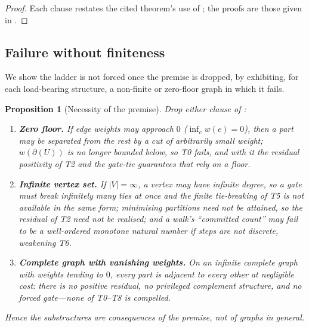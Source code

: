 \documentclass[11pt,a4paper]{article}
\theoremstyle{thmstyle}
\newtheorem{proposition}[theorem]{Proposition}
\theoremstyle{definition}
\theoremstyle{remark}
\newcommand{\V}{V}                        %
\newcommand{\wt}{w}                       %
\newcommand{\cut}{\partial}               %
\newcommand{\abs}[1]{\lvert#1\rvert}
\begin{document}
\begin{proof}
Each clause restates the cited theorem's use of ; the proofs are
those given in .
\end{proof}

\subsection{Failure without finiteness}

We show the ladder is not forced once the premise is dropped, by exhibiting, for
each load-bearing structure, a non-finite or zero-floor graph in which it fails.

\begin{proposition}[Necessity of the premise]
\label{prop:necessity}
Drop either clause of :
\begin{enumerate}[label=\textup{(\alph*)},leftmargin=2.2em]
\item \textbf{Zero floor.} If edge weights may approach $0$
\textup{(}$\inf_e\wt(e)=0$\textup{)}, then a part may be separated from the rest
by a cut of arbitrarily small weight; $\wt(\cut(U))$ is no longer bounded below,
so T0 fails, and with it the residual positivity of T2 and the gate-tie
guarantees that rely on a floor.
\item \textbf{Infinite vertex set.} If $\abs{\V}=\infty$, a vertex may have
infinite degree, so a gate must break infinitely many ties at once and the finite
tie-breaking of T5 is not available in the same form; minimising partitions need
not be attained, so the residual of T2 need not be realised; and a walk's
``committed count'' may fail to be a well-ordered monotone natural number if
steps are not discrete, weakening T6.
\item \textbf{Complete graph with vanishing weights.} On an infinite complete
graph with weights tending to $0$, every part is adjacent to every other at
negligible cost: there is no positive residual, no privileged complement
structure, and no forced gate---none of T0--T8 is compelled.
\end{enumerate}
Hence the substructures are consequences of the premise, not of graphs in
general.
\end{proposition}
\end{document}
